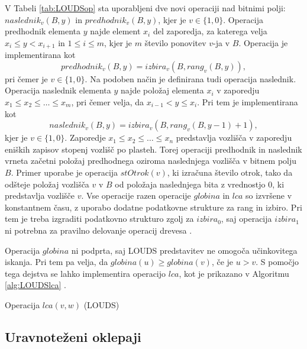  V Tabeli \ref{tab:LOUDSop} sta uporabljeni dve novi operaciji nad bitnimi polji: $naslednik_v(B,y)$ in $predhodnik_v(B,y)$, kjer je $v\in \{1,0\}$. Operacija predhodnik elementa $y$ najde element $x_i$ del zaporedja, za katerega velja $x_i \le y < x_{i+1}$ in $1\le i\le m$, kjer je $m$ število ponovitev $v$-ja v $B$. Operacija je implementirana kot
 $$predhodnik_v(B,y)=izbira_v(B,rang_v(B,y)),$$
 pri čemer je $v\in \{1,0\}$. Na podoben način je definirana tudi operacija naslednik. Operacija naslednik elementa $y$  najde položaj elementa $x_i$ v zaporedju $x_1\le x_2 \le \dots \le x_m$, pri čemer velja, da $x_{i-1}< y \le x_i$. Pri tem je implementirana kot
  $$naslednik_v(B,y)=izbira_v(B,rang_v(B,y-1)+1),$$
kjer je  $v\in \{1,0\}$. Zaporedje $x_1\le x_2 \le \dots \le x_n$ predstavlja vozlišča v zaporedju eniških zapisov stopenj vozlišč po plasteh. Torej operaciji predhodnik in naslednik vrneta začetni položaj predhodnega oziroma naslednjega vozlišča v bitnem polju $B$. Primer uporabe je operacija $stOtrok(v)$, ki izračuna število otrok, tako da odšteje položaj vozlišča $v$ v $B$ od položaja naslednjega bita z vrednostjo 0, ki predstavlja vozlišče $v$. Vse operacije razen operacije $globina$ in $lca$ so izvršene v konstantnem času, z uporabo dodatne podatkovne strukture za rang in izbiro. Pri tem je treba izgraditi podatkovno strukturo zgolj za $izbira_0$, saj operacija $izbira_1$ ni potrebna za pravilno delovanje operacij drevesa \cite{Navarro2016}.

 Operacija $globina$ ni podprta, saj LOUDS predstavitev ne omogoča učinkovitega iskanja. Pri tem pa velja, da $globina(u)\ge globina(v)$, če je $u>v$. S pomočjo tega dejstva se lahko implementira operacijo $lca$, kot je prikazano v Algoritmu \ref{alg:LOUDSlca} \cite{Navarro2016}.
 
 \begin{algorithm}[hbt]

\caption{Operacija $lca(v,w)$ (LOUDS)}\label{alg:LOUDSlca}
{
    
}
\end{algorithm}


\subsection{Uravnoteženi oklepaji}\label{sec:oklepaji}

